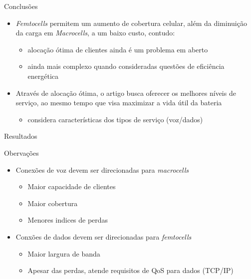 \begin{frame}{Conclusões}
  \begin{block}{}
    \begin{itemize}
      \item \textit{Femtocells} permitem um \alert{aumento de cobertura}
      celular, além da \alert{diminuição} da carga em \textit{Macrocells}, a um
      \alert{baixo custo}, contudo:
      \begin{itemize}
        \item alocação ótima de clientes ainda é um problema em aberto
        \item ainda mais complexo quando consideradas questões de eficiência
        energética
      \end{itemize}
    \end{itemize}
  \end{block}
  \pause
  \begin{block}{}
    \begin{itemize}
      \item Através de alocação ótima, o artigo busca oferecer os
      \alert{melhores níveis de serviço}, ao mesmo tempo que visa
      \alert{maximizar a vida útil da bateria}
      \begin{itemize}
        \item considera características dos tipos de serviço (voz/dados)
      \end{itemize}
    \end{itemize}
  \end{block}
\end{frame}

\begin{frame}{Resultados}
  \begin{block}{Obervações}
    \begin{itemize}
      \item Conexões de \alert{voz} devem ser direcionadas para
      \alert{\textit{macrocells}}
      \begin{itemize}
        \item Maior capacidade de clientes
        \item Maior cobertura
        \item Menores indices de perdas
      \end{itemize}
      \item Conxões de \alert{dados} devem ser direcionadas para
      \alert{\textit{femtocells}}
      \begin{itemize}
        \item Maior largura de banda
        \item Apesar das perdas, atende requisitos de QoS para dados (TCP/IP)
      \end{itemize}
    \end{itemize}
  \end{block}
\end{frame}

